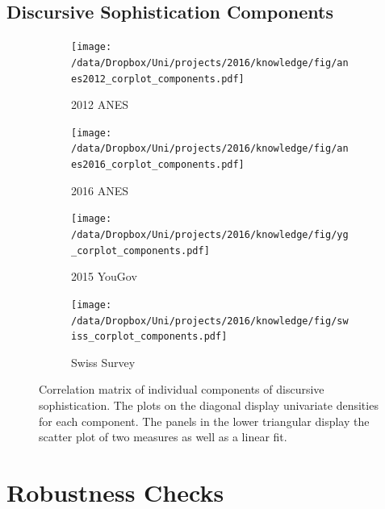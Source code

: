 \clearpage
\subsection{Discursive Sophistication Components}
\begin{figure}[h]
    \centering
    \begin{subfigure}[h]{0.4\textwidth}
        \centering
        \texttt{[image: /data/Dropbox/Uni/projects/2016/knowledge/fig/anes2012\_corplot\_components.pdf]}
        \caption{2012 ANES}
    \end{subfigure}%
    \begin{subfigure}[h]{0.4\textwidth}
         \centering
         \texttt{[image: /data/Dropbox/Uni/projects/2016/knowledge/fig/anes2016\_corplot\_components.pdf]}
         \caption{2016 ANES}
    \end{subfigure}%
    
    \begin{subfigure}[h]{0.4\textwidth}
        \centering
        \texttt{[image: /data/Dropbox/Uni/projects/2016/knowledge/fig/yg\_corplot\_components.pdf]}
        \caption{2015 YouGov}
    \end{subfigure}%
    \begin{subfigure}[h]{0.4\textwidth}
         \centering
         \texttt{[image: /data/Dropbox/Uni/projects/2016/knowledge/fig/swiss\_corplot\_components.pdf]}
         \caption{Swiss Survey}
    \end{subfigure}
    \caption[Correlation matrix of individual components of discursive sophistication.]{Correlation matrix of individual components of discursive sophistication. The plots on the diagonal display univariate densities for each component. The panels in the lower triangular display the scatter plot of two measures as well as a linear fit. %
     }\label{fig:components}
\end{figure}



\clearpage
\section{Robustness Checks}\label{app:robustness}



